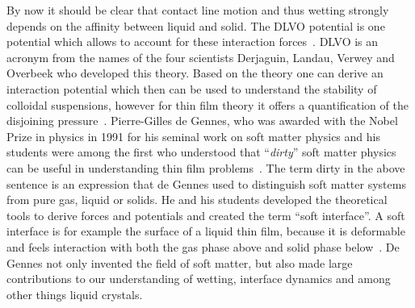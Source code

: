 By now it should be clear that contact line motion and thus wetting strongly depends on the affinity between liquid and solid. 
The DLVO potential is one potential which allows to account for these interaction forces~\cite{vActaPhysicochim1941, verweyTheoryStabilityLyophobic}. 
DLVO is an acronym from the names of the four scientists Derjaguin, Landau, Verwey and Overbeek who developed this theory. 
Based on the theory one can derive an interaction potential which then can be used to understand the stability of colloidal suspensions, however for thin film theory it offers a quantification of the disjoining pressure~\cite{oronLongscaleEvolutionThin1997, peschkaSignaturesSlipDewetting2019, moultonEffectDisjoiningPressure2013, diezGlobalModelsMoving2000}.
Pierre-Gilles de Gennes, who was awarded with the Nobel Prize in physics in 1991 for his seminal work on soft matter physics and his students were among the first who understood that ``\textit{dirty}'' soft matter physics can be useful in understanding thin film problems~\cite{degennesWettingStaticsDynamics1985,degennesFluidWallSlippage2002,degennesCapillarityWettingPhenomena2004}.
The term dirty in the above sentence is an expression that de Gennes used to distinguish soft matter systems from pure gas, liquid or solids. 
He and his students developed the theoretical tools to derive forces and potentials and created the term ``soft interface''.
A soft interface is for example the surface of a liquid thin film, because it is deformable and feels interaction with both the gas phase above and solid phase below~\cite{degennesCapillarityWettingPhenomena2004}.
De Gennes not only invented the field of soft matter, but also made large contributions to our understanding of wetting, interface dynamics and among other things liquid crystals.


